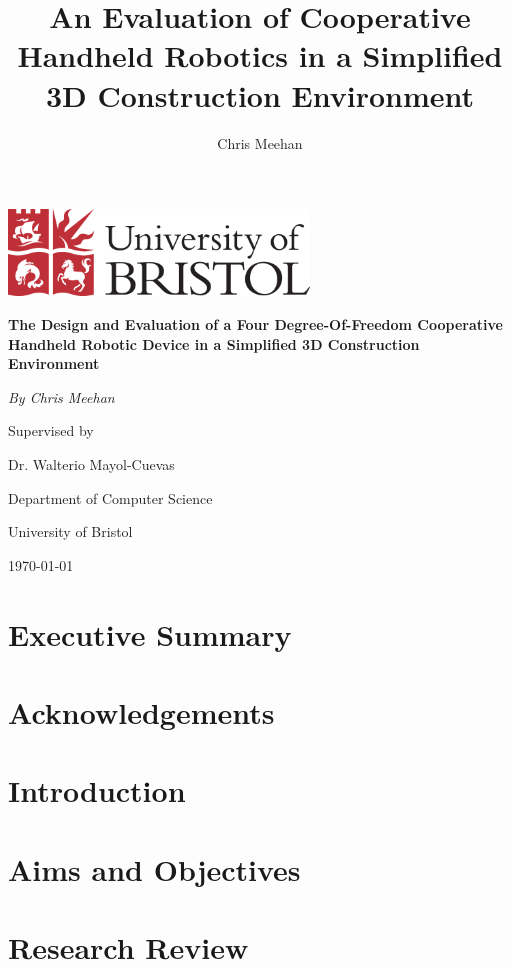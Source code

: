 \documentclass[11pt]{article}
\title{An Evaluation of Cooperative Handheld Robotics in a Simplified 3D Construction Environment}
\author{Chris Meehan}
\begin{document}
\begin{titlepage}
	\centering
	
	\includegraphics[width=0.6\textwidth]{bristol.png}
	\vspace{2cm}

	{\huge\bfseries The Design and Evaluation of a Four Degree-Of-Freedom Cooperative Handheld Robotic Device in a Simplified 3D Construction Environment\par}
	\vspace{1.5cm}

	{\Large\itshape By Chris Meehan\par}
	
	Supervised by\par
	Dr. Walterio Mayol-Cuevas
	
	\vspace{1.5cm}
	
	Department of Computer Science\par
	University of Bristol

	\vfill

	{\large \today\par}
\end{titlepage}

\section{Executive Summary}
\pagebreak

\section{Acknowledgements}
\pagebreak


\tableofcontents
\pagebreak

\section{Introduction}
\pagebreak

\section{Aims and Objectives}
\pagebreak

\section{Research Review}
\end{document}
